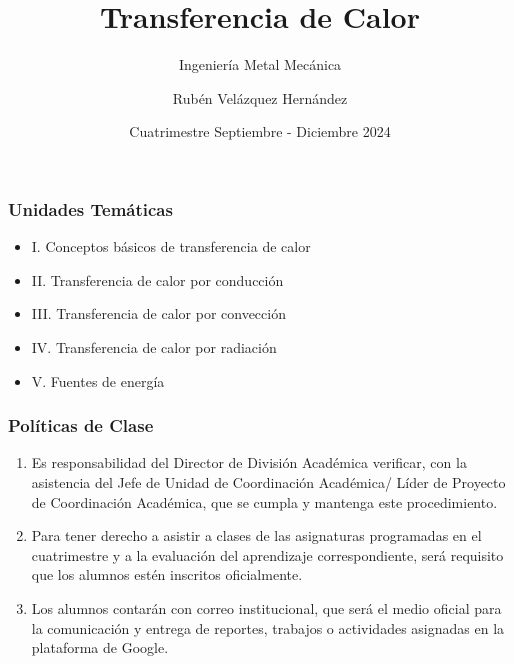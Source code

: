\documentclass{beamer}
\title[]{Transferencia de Calor}
\subtitle{ Ingeniería Metal Mecánica}
\author{Rubén Velázquez Hernández}
\institute[UTEQ]{Universidad Tecnológica de Querétaro}
\date{Cuatrimestre Septiembre - Diciembre 2024}
\begin{document}
 
\frame{\titlepage}

\begin{frame}
	
	\frametitle{Unidades Temáticas}
	\begin{itemize}
		\item I. Conceptos básicos de transferencia de calor
		\item II. Transferencia de calor por conducción
		\item III. Transferencia de calor por convección
		\item IV. Transferencia de calor por radiación 
		\item V. Fuentes de energía
	\end{itemize}
\end{frame}

\begin{frame}
	
\frametitle{Políticas de Clase}

\begin{enumerate}
	\item Es responsabilidad del Director de División Académica verificar, con la asistencia del Jefe de Unidad de Coordinación Académica/ Líder de Proyecto de Coordinación Académica, que se cumpla y mantenga este procedimiento.
	\item Para tener derecho a asistir a clases de las asignaturas programadas en el cuatrimestre y a la evaluación del aprendizaje correspondiente, será requisito que los alumnos estén inscritos oficialmente.
	\item Los alumnos contarán con correo institucional, que será el medio oficial para la comunicación y entrega de reportes, trabajos o actividades asignadas en la plataforma de Google.

\end{enumerate}

\end{frame}
\end{document}
